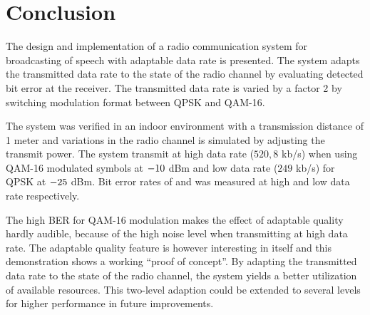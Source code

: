 \section{Conclusion}
\label{sec:conclusion}
The design and implementation of a radio communication system for broadcasting of speech with adaptable data rate is presented. The system adapts the transmitted data rate to the state of the radio channel by evaluating detected bit error at the receiver. The transmitted data rate is varied by a factor 2 by switching modulation format between QPSK and QAM-16. 

The system was verified in an indoor environment with a transmission distance of 1 meter and variations in the radio channel is simulated by adjusting the transmit power. The system transmit at high data rate ($520,8$ kb/s) when using QAM-16 modulated symbols at $-10$ dBm and low data rate ($249$ kb/s) for QPSK at $-25$ dBm. Bit error rates of \measBERQAMGood and \measBERQPSKBad was measured at high and low data rate respectively.

The high BER for QAM-16 modulation makes the effect of adaptable quality hardly audible, because of the high noise level when transmitting at high data rate. The adaptable quality feature is however interesting in itself and this demonstration shows a working ``proof of concept''. By adapting the transmitted data rate to the state of the radio channel, the system yields a better utilization of available resources. This two-level adaption could be extended to several levels for higher performance in future improvements.